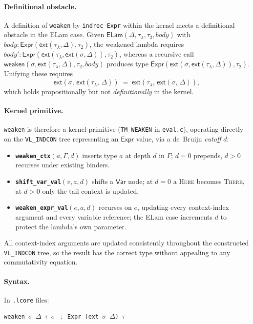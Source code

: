 \documentclass[10pt,a4paper]{article}
\theoremstyle{plain}
\theoremstyle{definition}
\theoremstyle{remark}
\begin{document}
\paragraph{Definitional obstacle.}
A definition of \texttt{weaken} by \texttt{indrec Expr} within the kernel
meets a definitional obstacle in the ELam case.  Given
$\mathsf{ELam}(\Delta,\tau_\lambda,\tau_2,\mathit{body})$ with
$\mathit{body}:\mathsf{Expr}(\mathsf{ext}(\tau_\lambda,\Delta),\tau_2)$,
the weakened lambda requires
$\mathit{body}':\mathsf{Expr}(\mathsf{ext}(\tau_\lambda,\mathsf{ext}(\sigma,\Delta)),\tau_2)$,
whereas a recursive call
$\mathsf{weaken}(\sigma,\mathsf{ext}(\tau_\lambda,\Delta),\tau_2,\mathit{body})$
produces type $\mathsf{Expr}(\mathsf{ext}(\sigma,\mathsf{ext}(\tau_\lambda,\Delta)),\tau_2)$.
Unifying these requires
\[
  \mathsf{ext}(\sigma,\,\mathsf{ext}(\tau_\lambda,\,\Delta))
  \;=\;
  \mathsf{ext}(\tau_\lambda,\,\mathsf{ext}(\sigma,\,\Delta)),
\]
which holds propositionally but not \emph{definitionally} in the kernel.

\paragraph{Kernel primitive.}
\texttt{weaken} is therefore a kernel primitive (\texttt{TM\_WEAKEN} in
\texttt{eval.c}), operating directly on the \texttt{VL\_INDCON} tree
representing an $\mathsf{Expr}$ value, via a de~Bruijn \emph{cutoff} $d$:
\begin{itemize}\itemsep2pt
\item \textbf{\texttt{weaken\_ctx}$(a,\Gamma,d)$} inserts type $a$ at
  depth $d$ in $\Gamma$; $d=0$ prepends, $d>0$ recurses under existing
  binders.
\item \textbf{\texttt{shift\_var\_val}$(v,a,d)$} shifts a $\mathsf{Var}$
  node; at $d=0$ a \textsc{Here} becomes \textsc{There}, at $d>0$ only
  the tail context is updated.
\item \textbf{\texttt{weaken\_expr\_val}$(e,a,d)$} recurses on $e$,
  updating every context-index argument and every variable reference; the
  ELam case increments $d$ to protect the lambda's own parameter.
\end{itemize}
All context-index arguments are updated consistently throughout the
constructed \texttt{VL\_INDCON} tree, so the result has the correct type
without appealing to any commutativity equation.

\paragraph{Syntax.} In \texttt{.lcore} files:
\begin{center}
\texttt{weaken}\ $\sigma$\ $\Delta$\ $\tau$\ $e$
$\;\;:\;\;$\texttt{Expr (ext}~$\sigma$~$\Delta$\texttt{)}~$\tau$
\end{center}
\end{document}
